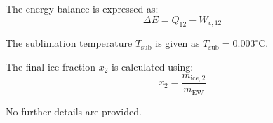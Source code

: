 The energy balance is expressed as:  
\[
\Delta E = Q_{12} - W_{v,12}
\]  

The sublimation temperature \( T_{\text{sub}} \) is given as \( T_{\text{sub}} = 0.003^\circ\text{C} \).  

The final ice fraction \( x_2 \) is calculated using:  
\[
x_2 = \frac{m_{\text{ice},2}}{m_{\text{EW}}}
\]  

No further details are provided.